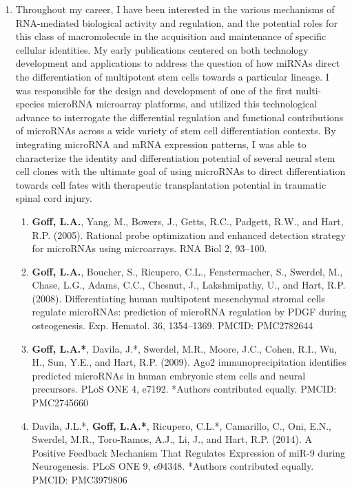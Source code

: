 \documentclass{nihbiosketch}
\begin{document}
\begin{enumerate}

\item Throughout my career, I have been interested in the various mechanisms of RNA-mediated biological activity and regulation, and the potential roles for this class of macromolecule in the acquisition and maintenance of specific cellular identities. My early publications centered on both technology development and applications to address the question of how miRNAs direct the differentiation of multipotent stem cells towards a particular lineage. I was responsible for the design and development of one of the first multi-species microRNA microarray platforms, and utilized this technological advance to interrogate the differential regulation and functional contributions of microRNAs across a wide variety of stem cell differentiation contexts. By integrating microRNA and mRNA expression patterns, I was able to characterize the identity and differentiation potential of several neural stem cell clones with the ultimate goal of using microRNAs to direct differentiation towards cell fates with therapeutic transplantation potential in traumatic spinal cord injury. 

\begin{enumerate}

\item	\textbf{Goff, L.A.}, Yang, M., Bowers, J., Getts, R.C., Padgett, R.W., and Hart, R.P. (2005). Rational probe optimization and enhanced detection strategy for microRNAs using microarrays. RNA Biol 2, 93–100.

\item	\textbf{Goff, L.A.}, Boucher, S., Ricupero, C.L., Fenstermacher, S., Swerdel, M., Chase, L.G., Adams, C.C., Chesnut, J., Lakshmipathy, U., and Hart, R.P. (2008). Differentiating human multipotent mesenchymal stromal cells regulate microRNAs: prediction of microRNA regulation by PDGF during osteogenesis. Exp. Hematol. 36, 1354–1369. PMCID: PMC2782644

\item	\textbf{Goff, L.A.*}, Davila, J.*, Swerdel, M.R., Moore, J.C., Cohen, R.I., Wu, H., Sun, Y.E., and Hart, R.P. (2009). Ago2 immunoprecipitation identifies predicted microRNAs in human embryonic stem cells and neural precursors. PLoS ONE 4, e7192. *Authors contributed equally. PMCID: PMC2745660

\item	Davila, J.L.*, \textbf{Goff, L.A.*}, Ricupero, C.L.*, Camarillo, C., Oni, E.N., Swerdel, M.R., Toro-Ramos, A.J., Li, J., and Hart, R.P. (2014). A Positive Feedback Mechanism That Regulates Expression of miR-9 during Neurogenesis. PLoS ONE 9, e94348. *Authors contributed equally. PMCID: PMC3979806



\end{enumerate}
\end{enumerate}
\end{document}
